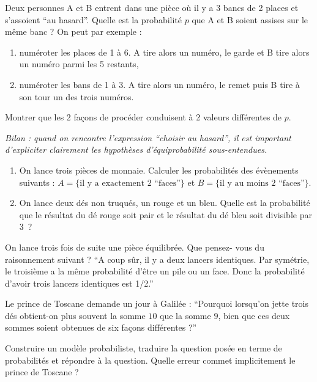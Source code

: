 \begin{exo}
Deux personnes A et B entrent dans une pièce où il y a 3 bancs de 2 places et s'assoient ``au hasard''. Quelle est la probabilité $p$ que A et B soient assises sur le même banc ? On peut par exemple :
\begin{enumerate}
\item numéroter les places de 1 \`a 6. A tire alors un numéro, le garde et B tire alors un numéro parmi les 5 restants,
\item num\'eroter les bans de 1 \`a 3. A tire alors un num\'ero, le remet puis B tire \`a son tour un des trois num\'eros.
\end{enumerate}

Montrer que les 2 fa\c cons de proc\'eder conduisent \`a 2 valeurs diff\'erentes de $p$.  

 \emph{Bilan : quand on rencontre l'expression ``choisir au hasard'', il est important d'expliciter clairement les hypothèses d'équiprobabilité sous-entendues.}
\end{exo}


\begin{exo}
\begin{enumerate}
\item On lance trois pièces de monnaie. Calculer les probabilités des
évènements suivants : $A = \{\text{il y a exactement 2 ``faces''} \}$ et 
$B = \{\text{il y au moins 2 ``faces''} \}$.
\item On lance deux dés non truqués, un rouge et
un bleu. Quelle est la probabilité que le résultat du dé rouge soit
pair et le résultat du dé bleu soit divisible par 3~?
\end{enumerate}
\end{exo}


\begin{exo} On lance trois fois de suite une pièce équilibrée. Que pensez- vous du raisonnement suivant ?
``A coup sûr, il y a deux lancers identiques. Par symétrie, le troisième a la même probabilité d'être un pile ou un face. Donc la probabilité d'avoir trois lancers identiques est 1/2.''
\end{exo}


\begin{exo}
Le prince de Toscane demande un jour {\`a} Galil{\'e}e : ``Pourquoi lorsqu'on jette
 trois d{\'e}s obtient-on plus souvent la somme $10$ que la somme $9$, bien que
 ces deux sommes soient obtenues de six fa{\c c}ons diff{\'e}rentes ?''
  
Construire un mod{\`e}le probabiliste, traduire la question pos{\'e}e en terme de probabilit\'es et r\'epondre \`a la question.
Quelle erreur commet implicitement le prince de Toscane ?
\end{exo}


